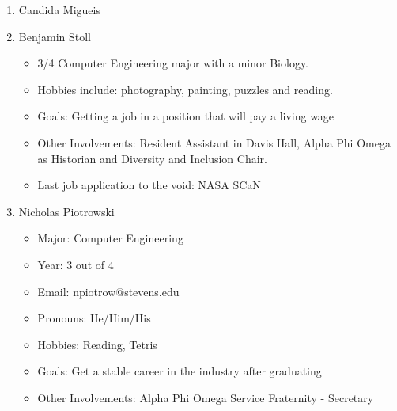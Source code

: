 \begin{enumerate}
    \item Candida Migueis
    \item Benjamin Stoll
        \begin{itemize}
            \item 3/4 Computer Engineering major with a minor Biology. 
            \item Hobbies include: photography, painting, puzzles and reading.
            \item Goals: Getting a job in a position that will pay a living wage
            \item Other Involvements: Resident Assistant in Davis Hall, Alpha Phi Omega as Historian and Diversity and Inclusion Chair.
            \item Last job application to the void: NASA SCaN
        \end{itemize}
    \item Nicholas Piotrowski
        \begin{itemize}
        \item Major: Computer Engineering
        \item Year: 3 out of 4
        \item Email: npiotrow@stevens.edu
        \item Pronouns: He/Him/His
        \item Hobbies: Reading, Tetris
        \item Goals: Get a stable career in the industry after graduating
        \item Other Involvements: Alpha Phi Omega Service Fraternity - Secretary
        \end{itemize}
\end{enumerate}
